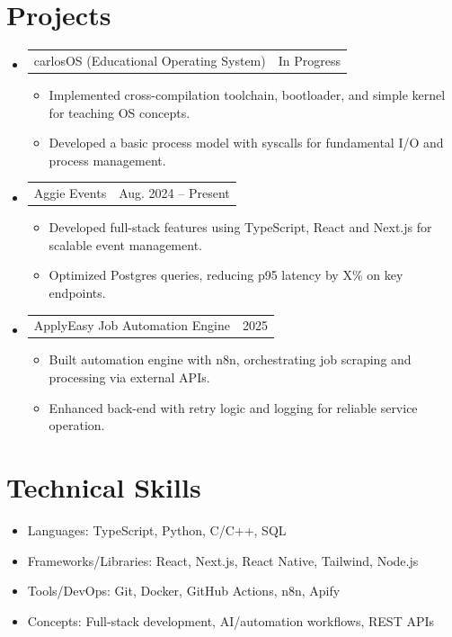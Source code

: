 \documentclass[letterpaper,11pt]{article}
\makeatletter
\newcommand{\resumeItem}[1]{
  \item\small{{#1 \vspace{-2pt}}}
}
\newcommand{\resumeProjectHeading}[2]{
  \item
  \begin{tabular*}{0.97\textwidth}{l@{\extracolsep{\fill}}r}
    \small#1 & #2 \\
  \end{tabular*}\vspace{-7pt}
}
\newcommand{\resumeSubHeadingListStart}{\begin{itemize}[leftmargin=0.15in, label={}]}
\newcommand{\resumeSubHeadingListEnd}{\end{itemize}}
\newcommand{\resumeItemListStart}{\begin{itemize}}
\newcommand{\resumeItemListEnd}{\end{itemize}\vspace{-5pt}}
\makeatother
\begin{document}
\section{Projects}
\resumeSubHeadingListStart
\resumeProjectHeading
  {carlosOS (Educational Operating System)}{In Progress}
\resumeItemListStart
\resumeItem{Implemented cross-compilation toolchain, bootloader, and simple kernel for teaching OS concepts.}
\resumeItem{Developed a basic process model with syscalls for fundamental I/O and process management.}
\resumeItemListEnd

\resumeProjectHeading
  {Aggie Events}{Aug. 2024 -- Present}
\resumeItemListStart
\resumeItem{Developed full-stack features using TypeScript, React and Next.js for scalable event management.}
\resumeItem{Optimized Postgres queries, reducing p95 latency by {X}\% on key endpoints.}
\resumeItemListEnd

\resumeProjectHeading
  {ApplyEasy Job Automation Engine}{2025}
\resumeItemListStart
\resumeItem{Built automation engine with n8n, orchestrating job scraping and processing via external APIs.}
\resumeItem{Enhanced back-end with retry logic and logging for reliable service operation.}
\resumeItemListEnd
\resumeSubHeadingListEnd

\section{Technical Skills}
\resumeSubHeadingListStart
\resumeItem{Languages: TypeScript, Python, C/C++, SQL}
\resumeItem{Frameworks/Libraries: React, Next.js, React Native, Tailwind, Node.js}
\resumeItem{Tools/DevOps: Git, Docker, GitHub Actions, n8n, Apify}
\resumeItem{Concepts: Full-stack development, AI/automation workflows, REST APIs}
\resumeSubHeadingListEnd
\end{document}
